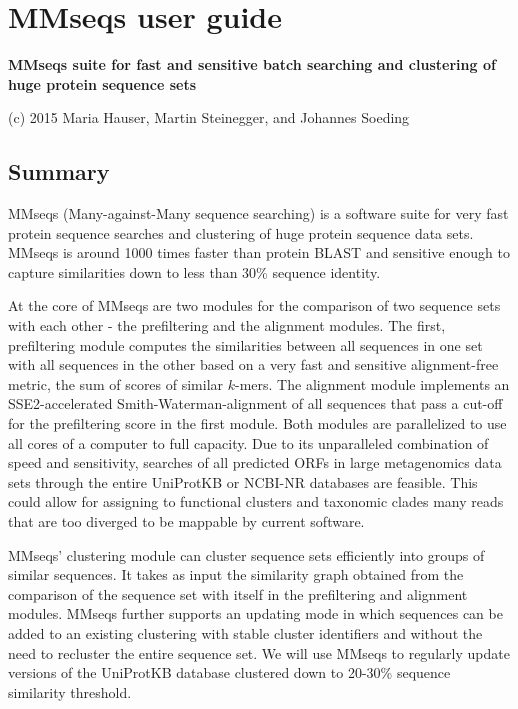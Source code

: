 \documentclass[11pt,a4paper]{report}
\begin{document}
\chapter*{MMseqs user guide}
\renewcommand*\thesection{\arabic{section}}

\textbf{MMseqs suite for fast and sensitive batch searching and clustering
of huge protein sequence sets}

(c) 2015 Maria Hauser, Martin Steinegger, and Johannes Soeding


\section{Summary}

MMseqs (Many-against-Many sequence searching) is a software suite
for very fast protein sequence searches and clustering of huge protein
sequence data sets. MMseqs is around 1000 times faster than protein
BLAST and sensitive enough to capture similarities down to less than
30\% sequence identity.

At the core of MMseqs are two modules for the comparison of two sequence
sets with each other - the prefiltering and the alignment modules.
The first, prefiltering module computes the similarities between all
sequences in one set with all sequences in the other based on a very
fast and sensitive alignment-free metric, the sum of scores of similar
$k$-mers. The alignment module implements an SSE2-accelerated Smith-Waterman-alignment
of all sequences that pass a cut-off for the prefiltering score in
the first module. Both modules are parallelized to use all cores of
a computer to full capacity. Due to its unparalleled combination of
speed and sensitivity, searches of all predicted ORFs in large metagenomics
data sets through the entire UniProtKB or NCBI-NR databases are feasible.
This could allow for assigning to functional clusters and taxonomic
clades many reads that are too diverged to be mappable by current
software.

MMseqs' clustering module can cluster sequence sets efficiently into
groups of similar sequences. It takes as input the similarity graph
obtained from the comparison of the sequence set with itself in the
prefiltering and alignment modules. MMseqs further supports an updating
mode in which sequences can be added to an existing clustering with
stable cluster identifiers and without the need to recluster the entire
sequence set. We will use MMseqs to regularly update versions of the
UniProtKB database clustered down to 20-30\% sequence similarity threshold.
\end{document}
